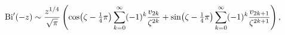 \[\mathop{\mathrm{Bi}\/}\nolimits'\!\left(-z\right)\sim\frac{z^{1/4}}{\sqrt{\pi}%
}\left(\mathop{\cos\/}\nolimits\!\left(\zeta-\tfrac{1}{4}\pi\right)\sum_{k=0}^%
{\infty}(-1)^{k}\frac{v_{2k}}{\zeta^{2k}}+\mathop{\sin\/}\nolimits\!\left(%
\zeta-\tfrac{1}{4}\pi\right)\sum_{k=0}^{\infty}(-1)^{k}\frac{v_{2k+1}}{\zeta^{%
2k+1}}\right),\]